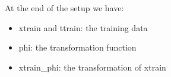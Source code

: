 \documentclass[a4]{article}
\begin{document}
%
%
At the end of the setup we have:
\begin{itemize}
	\item xtrain and ttrain: the training data
	\item phi: the transformation function
	\item xtrain\_phi: the transformation of xtrain
\end{itemize} 
\end{document}
